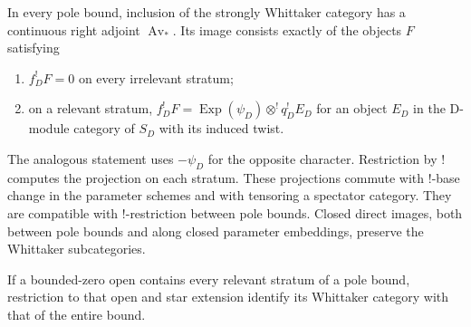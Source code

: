\begin{proposition}
\label{whittaker:strata-properties}
In every pole bound, inclusion of the strongly Whittaker category has a
continuous right adjoint $\operatorname{Av}_*$. Its image consists exactly
of the objects $F$ satisfying
\begin{enumerate}
\item $f_D^!F=0$ on every irrelevant stratum;
\item on a relevant stratum,
$f_D^!F=\operatorname{Exp}(\psi_D)\otimes^!q_D^!E_D$ for an object $E_D$
in the D-module category of $S_D$ with its induced twist.
\end{enumerate}
The analogous statement uses $-\psi_D$ for the opposite character.
Restriction by $!$ computes the projection on each stratum. These
projections commute with $!$-base change in the parameter schemes and
with tensoring a spectator category. They are compatible with
$!$-restriction between pole bounds. Closed direct images, both between
pole bounds and along closed parameter embeddings, preserve the
Whittaker subcategories.

If a bounded-zero open contains every relevant stratum of a pole bound,
restriction to that open and star extension identify its Whittaker
category with that of the entire bound.
\end{proposition}

